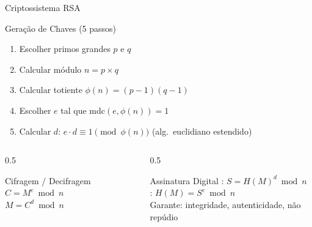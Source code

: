\documentclass{libs/ufc_format}
\begin{document}
\begin{frame}{Criptossistema RSA}
    \begin{block}{Geração de Chaves (5 passos) \cite{rivest1978, tomaz2014}}
        \begin{enumerate}
            \item Escolher primos grandes $p$ e $q$
            \item Calcular módulo $n = p \times q$
            \item Calcular totiente $\phi(n) = (p-1)(q-1)$
            \item Escolher $e$ tal que $\text{mdc}(e, \phi(n)) = 1$
            \item Calcular $d$: \; $e \cdot d \equiv 1 \pmod{\phi(n)}$ \; (alg.\ euclidiano estendido)
        \end{enumerate}
    \end{block}

    \vspace{0.3cm}

    \begin{columns}
        \begin{column}{0.5\textwidth}
            \begin{exampleblock}{Cifragem / Decifragem}
                $C = M^e \bmod n$ \\[4pt]
                $M = C^d \bmod n$
            \end{exampleblock}
        \end{column}
        \begin{column}{0.5\textwidth}
            \begin{alertblock}{Assinatura Digital}
                : $S = H(M)^d \bmod n$ \\[4pt]
                : $H(M) = S^e \bmod n$ \\[4pt]
                {\small Garante: integridade, autenticidade, não repúdio}
            \end{alertblock}
        \end{column}
    \end{columns}
\end{frame}
\end{document}
